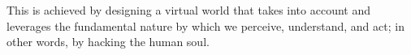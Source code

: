 This is achieved by designing a virtual world that takes into account and leverages the fundamental nature by which we perceive, understand, and act; in other words, by hacking the human soul.

